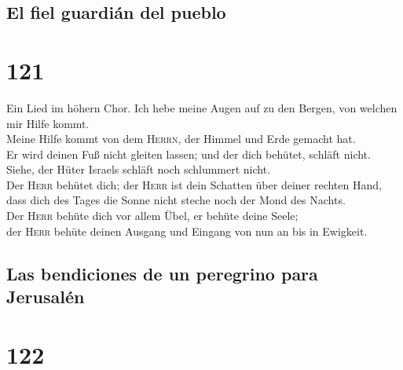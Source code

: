 \hypertarget{el-fiel-guardiuxe1n-del-pueblo}{%
\subsection{El fiel guardián del
pueblo}\label{el-fiel-guardiuxe1n-del-pueblo}}

\hypertarget{section-120}{%
\section{121}\label{section-120}}

 Ein Lied im höhern Chor. Ich hebe meine Augen auf zu den
Bergen, von welchen mir Hilfe kommt.\\
 Meine Hilfe kommt von dem \textsc{Herrn}, der Himmel und
Erde gemacht hat.\\
 Er wird deinen Fuß nicht gleiten lassen; und der dich
behütet, schläft nicht.\\
 Siehe, der Hüter Israels schläft noch schlummert nicht.\\
 Der \textsc{Herr} behütet dich; der \textsc{Herr} ist
dein Schatten über deiner rechten Hand,\\
 dass dich des Tages die Sonne nicht steche noch der Mond
des Nachts.\\
 Der \textsc{Herr} behüte dich vor allem Übel, er behüte
deine Seele;\\
 der \textsc{Herr} behüte deinen Ausgang und Eingang von
nun an bis in Ewigkeit.

\hypertarget{las-bendiciones-de-un-peregrino-para-jerusaluxe9n}{%
\subsection{Las bendiciones de un peregrino para
Jerusalén}\label{las-bendiciones-de-un-peregrino-para-jerusaluxe9n}}

\hypertarget{section-121}{%
\section{122}\label{section-121}}

